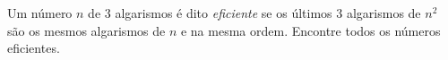 Um número $n$ de $3$ algarismos é dito \emph{eficiente} se os últimos $3$ algarismos de $n^2$ são os mesmos algarismos de $n$ e na mesma ordem. Encontre todos os números eficientes.
